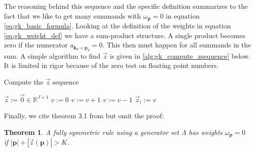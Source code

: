 \documentclass[a4paper,10pt]{article}
\newtheorem*{theorem*}{Theorem}
\begin{document}
The reasoning behind this sequence and the specific definition summarizes to
the fact that we like to get many summands with $\omega_{\mathbf{p}} = 0$ in
equation \eqref{eq:gk_basic_formula}. Looking at the definition of the weights
in equation \eqref{eq:gk_weight_def} we have a sum-product structure. A single
product becomes zero if the numerator $a_{\mathbf{k}_d+\mathbf{p}_d} = 0$. This
then must happen for all summands in the sum. A simple algorithm to find $\vec{z}$
is given in \eqref{alg:gk_compute_zsequence} below. It is limited in rigor because
of the zero test on floating point numbers.

\begin{algorithm}[h!]
  \caption{Compute the $\vec{z}$ sequence}
  \label{alg:gk_compute_zsequence}
  \begin{algorithmic}
      \State $\vec{z} := \vec{0} \in \mathbb{R}^{J+1}$
      \State $v := 0$
            \State $v := v + 1$
          \EndWhile
        \Else
          \State $v := v - 1$
        \EndIf
        \State $\vec{z}_i := v$
      \EndFor
    \EndProcedure
  \end{algorithmic}
\end{algorithm}

Finally, we cite theorem 3.1 from \cite{genz} but omit the proof:

\begin{theorem*}
  \label{th:zero_weights}
  A fully symmetric rule using a generator set $\Lambda$ has weights $\omega_{\mathbf{p}} = 0$
  if $|\mathbf{p}| + |\vec{z}(\mathbf{p})| > K$.
\end{theorem*}
\end{document}
